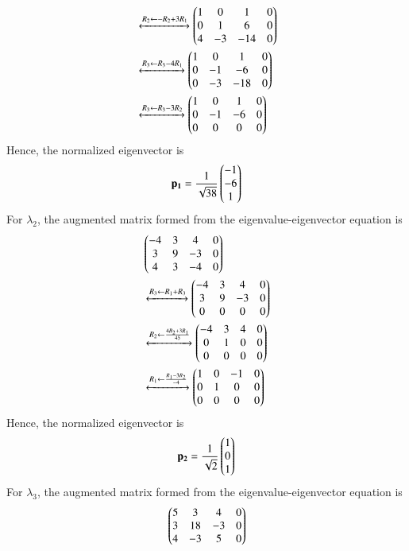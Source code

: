 \documentclass[journal,12pt,twocolumn]{IEEEtran}
\renewcommand{\vec}[1]{\boldsymbol{\mathbf{#1}}}
\begin{document}
\begin{enumerate}
\begin{enumerate}
\begin{align}
            &\xleftrightarrow[]{R_2 \leftarrow -R_2+3R_1} \begin{pmatrix}1&0&1&0\\0&1&6&0\\4&-3&-14&0\end{pmatrix} \\
            &\xleftrightarrow[]{R_3 \leftarrow R_3-4R_1} \begin{pmatrix}1&0&1&0\\0&-1&-6&0\\0&-3&-18&0\end{pmatrix} \\
            &\xleftrightarrow[]{R_3 \leftarrow R_3-3R_2} \begin{pmatrix}1&0&1&0\\0&-1&-6&0\\0&0&0&0\end{pmatrix}
        \end{align}
        Hence, the normalized eigenvector is
        \begin{align}
            \vec{p_1} = \frac{1}{\sqrt{38}}\myvec{-1\\-6\\1}
        \end{align}
        For $\lambda_2$, the augmented matrix formed from the 
        eigenvalue-eigenvector equation is
        \begin{align}
            &\begin{pmatrix}-4&3&4&0\\3&9&-3&0\\4&3&-4&0\end{pmatrix} \nonumber \\
            &\xleftrightarrow[]{R_3 \leftarrow R_1+R_3} \begin{pmatrix}-4&3&4&0\\3&9&-3&0\\0&0&0&0\end{pmatrix} \\
            &\xleftrightarrow[]{R_2 \leftarrow \frac{4R_2+3R_1}{45}} \begin{pmatrix}-4&3&4&0\\0&1&0&0\\0&0&0&0\end{pmatrix} \\
            &\xleftrightarrow[]{R_1 \leftarrow \frac{R_1-3R_2}{-4}} \begin{pmatrix}1&0&-1&0\\0&1&0&0\\0&0&0&0\end{pmatrix}
        \end{align}
        Hence, the normalized eigenvector is
        \begin{align}
            \vec{p_2} = \frac{1}{\sqrt{2}}\myvec{1\\0\\1}
        \end{align}
        For $\lambda_3$, the augmented matrix formed from the 
        eigenvalue-eigenvector equation is
        \begin{align}
            &\myvec{5&3&4&0\\3&18&-3&0\\4&-3&5&0} \nonumber \\ 

\end{align}
\end{enumerate}
\end{enumerate}
\end{document}
